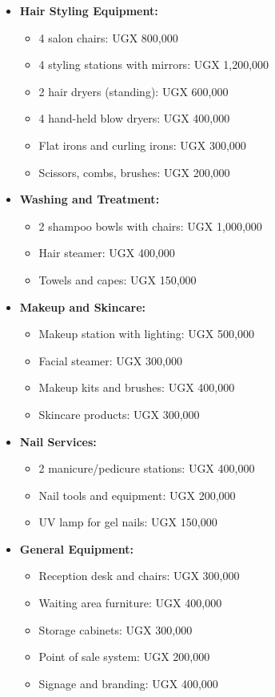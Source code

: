 \begin{itemize}[leftmargin=2em]
    \item \textbf{Hair Styling Equipment:}
    \begin{itemize}
        \item 4 salon chairs: UGX 800,000
        \item 4 styling stations with mirrors: UGX 1,200,000
        \item 2 hair dryers (standing): UGX 600,000
        \item 4 hand-held blow dryers: UGX 400,000
        \item Flat irons and curling irons: UGX 300,000
        \item Scissors, combs, brushes: UGX 200,000
    \end{itemize}
    
    \item \textbf{Washing and Treatment:}
    \begin{itemize}
        \item 2 shampoo bowls with chairs: UGX 1,000,000
        \item Hair steamer: UGX 400,000
        \item Towels and capes: UGX 150,000
    \end{itemize}
    
    \item \textbf{Makeup and Skincare:}
    \begin{itemize}
        \item Makeup station with lighting: UGX 500,000
        \item Facial steamer: UGX 300,000
        \item Makeup kits and brushes: UGX 400,000
        \item Skincare products: UGX 300,000
    \end{itemize}
    
    \item \textbf{Nail Services:}
    \begin{itemize}
        \item 2 manicure/pedicure stations: UGX 400,000
        \item Nail tools and equipment: UGX 200,000
        \item UV lamp for gel nails: UGX 150,000
    \end{itemize}
    
    \item \textbf{General Equipment:}
    \begin{itemize}
        \item Reception desk and chairs: UGX 300,000
        \item Waiting area furniture: UGX 400,000
        \item Storage cabinets: UGX 300,000
        \item Point of sale system: UGX 200,000
        \item Signage and branding: UGX 400,000
    \end{itemize}
\end{itemize}

